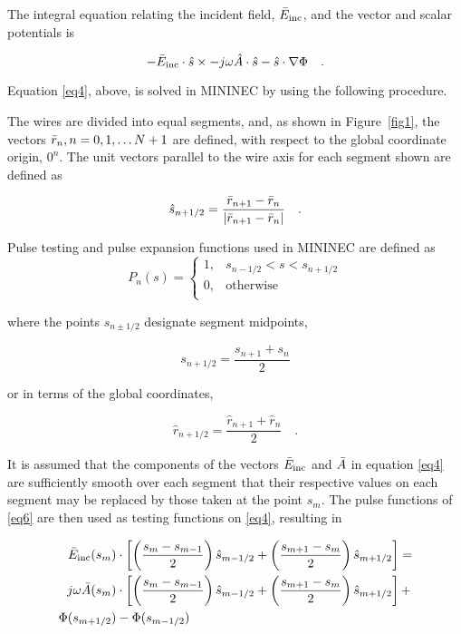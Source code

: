 \documentclass[12pt]{article}
\begin{document}
The integral equation relating the incident field, $\bar{E}_{\mathrm{inc}}$, and the
vector and scalar potentials is

\begin{equation}
-\bar{E}_{\mathrm{inc}}\cdot\hat{s}\times
-j\omega\hat{A}\cdot\hat{s}-\hat{s}\cdot\nabla\Phi
\quad .
\label{eq4}
\end{equation}

Equation \eqref{eq4}, above, is solved in MININEC by using the following
procedure.

The wires are divided into equal segments, and, as shown in
Figure~\ref{fig1}, the vectors $\bar{r}_n, n=0, 1, \ldots N+1$ are
defined, with respect to the global coordinate origin, $0^n$. The unit
vectors parallel to the wire axis for each segment shown are defined as

\begin{equation}
\hat{s}_{n+1/2} = \frac{\bar{r}_{n+1}
- \bar{r}_n}{|\bar{r}_{n+1}-\bar{r}_n|}
\quad .
\label{eq5}
\end{equation}

Pulse testing and pulse expansion functions used in MININEC are defined as
\begin{equation}
P_n(s) = \left\{
\begin{array}{ll}
1, & s_{n-1/2} < s < s_{n+1/2} \\
0, & \mathrm{otherwise}        \\
\end{array}\right.
\label{eq6}
\end{equation}

where the points $s_{n\pm1/2}$ designate segment midpoints,

\begin{equation}
s_{n+1/2} = \frac{s_{n+1} + s_n}{2}
\label{eq7}
\end{equation}

or in terms of the global coordinates,

\begin{equation}
\hat{r}_{n+1/2} = \frac{\hat{r}_{n+1} + \hat{r}_n}{2}
\quad.
\label{eq8}
\end{equation}

It is assumed that the components of the vectors $\bar{E}_{\mathrm{inc}}$
and $\bar{A}$ in equation \eqref{eq4} are sufficiently smooth over each
segment that their respective values on each segment may be replaced by
those taken at the point $s_m$. The pulse functions of \eqref{eq6} are
then used as testing functions on \eqref{eq4}, resulting in

\begin{equation}
\begin{aligned}
\bar{E}_{\mathrm{inc}}(s_m)&\cdot
\left[\left(\frac{s_m-s_{m-1}}{2}\right)\hat{s}_{m-1/2}
+ \left(\frac{s_{m+1} - s_m}{2}\right)\hat{s}_{m+1/2}\right] = \\
j\omega\bar{A}(s_m)&\cdot
\left[\left(\frac{s_m-s_{m-1}}{2}\right)\hat{s}_{m-1/2}
+ \left(\frac{s_{m+1}-s_m}{2}\right)\hat{s}_{m+1/2}\right] + \\
\Phi(s_{m+1/2}) &- \Phi(s_{m-1/2}) \\
\end{aligned}
\label{eq9}
\end{equation}
\end{document}

